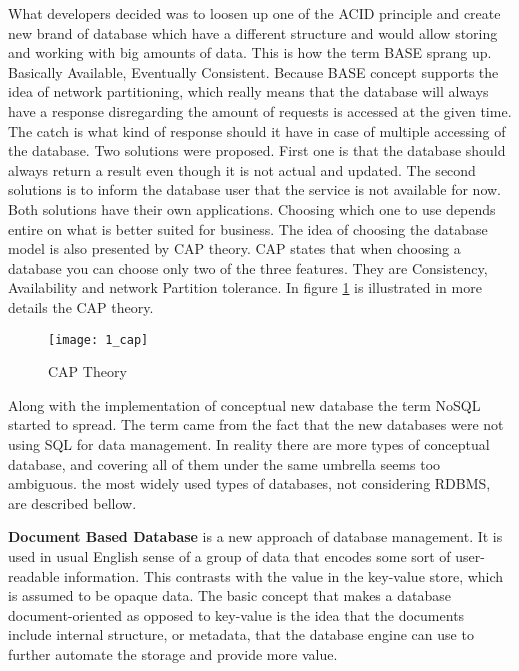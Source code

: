 What developers decided was to loosen up one of the ACID principle and create new brand of database which have a different structure and would allow storing and working with big amounts of data. This is how the term BASE sprang up. Basically Available, Eventually Consistent. Because BASE concept supports the idea of network partitioning, which really means that the database will always have a response disregarding the amount of requests is accessed at the given time. The catch is what kind of response should it have in case of multiple accessing of the database. Two solutions were proposed. First one is that the database should always return a result even though it is not actual and updated. The second solutions is to inform the database user that the service is not available for now. Both solutions have their own applications. Choosing which one to use depends entire on what is better suited for business. The idea of choosing the database model is also presented by CAP theory. CAP states that when choosing a database you can choose only two of the three features. They are Consistency, Availability and network Partition tolerance. In figure \ref{cap} is illustrated in more details the CAP theory.

\begin{figure}[!ht]
\centering
\texttt{[image: 1\_cap]}
\caption{CAP Theory}\label{cap}
\end{figure}

Along with the implementation of conceptual new database the term NoSQL started to spread. The term came from the fact that the new databases were not using SQL for data management. In reality there are more types of conceptual database, and covering all of them under the same umbrella seems too ambiguous.
the most widely used types of databases, not considering RDBMS, are described bellow.

\textbf{Document Based Database} is a new approach of database management. It is used in usual English sense of a group of data that encodes some sort of user-readable information. This contrasts with the value in the key-value store, which is assumed to be opaque data. The basic concept that makes a database document-oriented as opposed to key-value is the idea that the documents include internal structure, or metadata, that the database engine can use to further automate the storage and provide more value.

